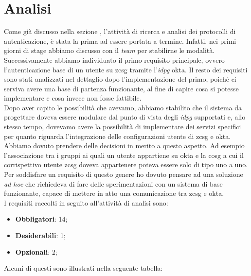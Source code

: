 \section{Analisi}\label{sec:requisiti}
Come già discusso nella sezione , l'attività di ricerca e analisi dei protocolli di autenticazione, è stata la prima ad essere portata a termine. Infatti, nei primi giorni di stage abbiamo discusso con il \textit{team} per stabilirne le modalità. Successivamente abbiamo individuato il primo requisito principale, ovvero l'autenticazione base di un utente su \gls{zcsg} tramite l'\textit{\gls{idpg}} \gls{okta}. Il resto dei requisiti sono stati analizzati nel dettaglio dopo l'implementazione del primo, poiché ci serviva avere una base di partenza funzionante, al fine di capire cosa si potesse implementare e cosa invece non fosse fattibile. \\
Dopo aver capito le possibilità che avevamo, abbiamo stabilito che il sistema da progettare doveva essere modulare dal punto di vista degli \textit{\gls{idpg}} supportati e, allo stesso tempo, dovevamo avere la possibilità di implementare dei servizi specifici per quanto riguarda l'integrazione delle configurazioni utente di \gls{zcsg} e \gls{okta}. Abbiamo dovuto prendere delle decisioni in merito a questo aspetto. Ad esempio l'associazione tra i gruppi ai quali un utente appartiene su \gls{okta} e la \gls{cosg} a cui il corrispettivo utente \gls{zcsg} doveva appartenere poteva essere solo di tipo uno a uno. Per soddisfare un requisito di questo genere ho dovuto pensare ad una soluzione \textit{ad hoc} che richiedeva di fare delle sperimentazioni con un sistema di base funzionante, capace di mettere in atto una comunicazione tra \gls{zcsg} e \gls{okta}. \\
I requisiti raccolti in seguito all'attività di analisi sono:
\begin{itemize}
    \setlength\itemsep{0em}
    \item \textbf{Obbligatori}: 14;
    \item \textbf{Desiderabili}: 1;
    \item \textbf{Opzionali}: 2;
\end{itemize}
 
Alcuni di questi sono illustrati nella seguente tabella:

\newpage

